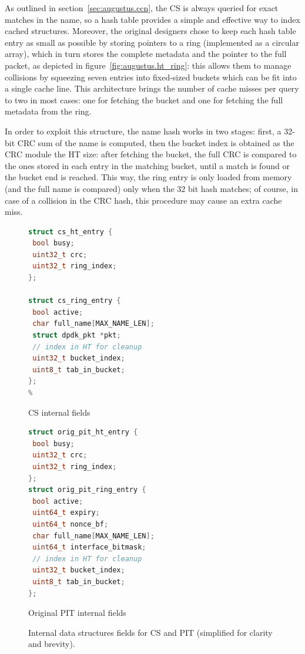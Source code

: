 \documentclass[11pt,a4paper,twoside,titlepage,openany]{book}
\begin{document}
As outlined in section~\ref{sec:augustus.ccn}, the CS is always queried for exact matches in the name, so a hash table provides a simple and effective way to index cached structures. Moreover, the original designers chose to keep each hash table entry as small as possible by storing pointers to a ring (implemented as a circular array), which in turn stores the complete metadata and the pointer to the full packet, as depicted in figure~\ref{fig:augustus.ht_ring}: this allows them to manage collisions by squeezing seven entries into fixed-sized buckets which can be fit into a single cache line. This architecture brings the number of cache misses per query to two in most cases: one for fetching the bucket and one for fetching the full metadata from the ring.

In order to exploit this structure, the name hash works in two stages: first, a 32-bit \gls{CRC} sum of the name is computed, then the bucket index is obtained as the CRC module the HT size: after fetching the bucket, the full \gls{CRC} is compared to the ones stored in each entry in the matching bucket, until a match is found or the bucket end is reached. This way, the ring entry is only loaded from memory (and the full name is compared) only when the 32 bit hash matches; of course, in case of a collision in the CRC hash, this procedure may cause an extra cache miss.

\begin{figure}[tb]
  \captionsetup{type=lstlisting}
  \begin{sublstlisting}[t]{.5\linewidth}
  \begin{lstlisting}[language=c,escapechar=\%]
struct cs_ht_entry {
 bool busy;
 uint32_t crc;
 uint32_t ring_index;
};

struct cs_ring_entry {
 bool active;
 char full_name[MAX_NAME_LEN];
 struct dpdk_pkt *pkt;
 // index in HT for cleanup
 uint32_t bucket_index;
 uint8_t tab_in_bucket;
};
%
    \end{lstlisting}
    \caption{CS internal fields}\label{lst:augustus.cs}
  \end{sublstlisting}%
  \begin{sublstlisting}[t]{.5\linewidth}
  \begin{lstlisting}[language=c]
struct orig_pit_ht_entry {
 bool busy;
 uint32_t crc;
 uint32_t ring_index;
};
struct orig_pit_ring_entry {
 bool active;
 uint64_t expiry;
 uint64_t nonce_bf;
 char full_name[MAX_NAME_LEN];
 uint64_t interface_bitmask;
 // index in HT for cleanup
 uint32_t bucket_index;
 uint8_t tab_in_bucket;
};
    \end{lstlisting}
    \caption{Original PIT internal fields}\label{lst:augustus.oldpit}
  \end{sublstlisting}
  \caption[CS and original PIT internal data structures fields]{Internal data structures fields for CS and PIT (simplified for clarity and brevity).}\label{lst:augustus.cs_oldpit}
\end{figure}
\end{document}
